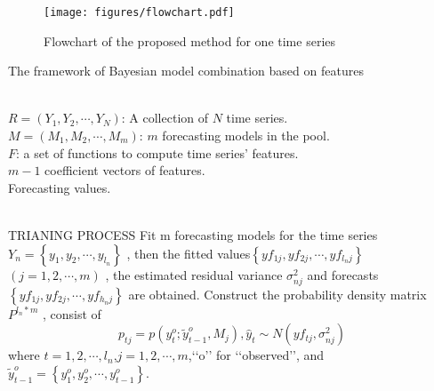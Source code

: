 \documentclass[a4paper,review,11pt,authoryear]{elsarticle}
\begin{document}
\begin{figure}
  \centering \texttt{[image: figures/flowchart.pdf]}
  \caption{Flowchart of the proposed method for one time series}
  \label{fig:flowchart}
\end{figure}


\begin{algorithm}
  \renewcommand{\algorithmicrequire}{\textbf{Input:}}
  \renewcommand{\algorithmicensure}{\textbf{Output:}}
  \caption{The framework of Bayesian model combination based on features}
  \label{alg:opt}
  \begin{algorithmic}
    \Require ~~\\
    $R=\left( {{Y}_{1}},{{Y}_{2}},\cdots ,{{Y}_{N}} \right)$: A collection of $N$ time series.\\
    $M=\left( {{M}_{1}},{{M}_{2}},\cdots ,{{M}_{m}} \right)$: $m$ forecasting models in the pool.\\
    $F$: a set of functions to compute time series’ features.
    \Ensure ~~\\
    $m-1$ coefficient vectors of features.\\
    Forecasting values.
  \end{algorithmic}
  \begin{algorithmic}[1]
  	\\
  	TRIANING PROCESS
  	\State Fit m forecasting models for the time series${{Y}_{n}}=\left\{ {{y}_{1}},{{y}_{2}},\cdots ,{{y}_{{{l}_{n}}}} \right\}$ , then the fitted values$\left\{ y{{f}_{1j}},y{{f}_{2j}},\cdots ,y{{f}_{{{l}_{n}}j}} \right\}$$\left( j=1,2,\cdots ,m \right)$ , the estimated residual variance $\sigma _{nj}^{2}$ and forecasts $\left\{ y{{f}_{1j}},y{{f}_{2j}},\cdots ,y{{f}_{{{h}_{n}}j}} \right\}$ are obtained.
  	\State Construct the probability density matrix ${{P}^{{{l}_{n}}*m}}$ , consist of
  	\[{{p}_{tj}}=p\left( y_{t}^{o};\widetilde{y}_{t-1}^{o},{{M}_{j}} \right),{{\widehat{y}}_{t}}\sim N\left( y{{f}_{tj}},\sigma _{nj}^{2} \right)\]
  	where $t=1,2,\cdots ,{{l}_{n}}$,$j=1,2,\cdots ,m$,‘‘o’’ for ‘‘observed’’, and $\widetilde{y}_{t-1}^{o}=\left\{ y_{1}^{o},y_{2}^{o},\cdots ,y_{t-1}^{o} \right\}$.
$$
\end{algorithmic}
\end{algorithm}
\end{document}
